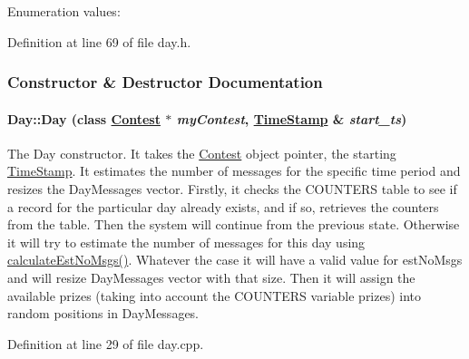 \begin{Desc}
\item[Enumeration values: ]\par
\begin{description}
\item[{\em 
\hypertarget{classDay_Dayu4Dayu1}{
{\em default\_\-est\-No\-Msgs}}
\label{classDay_Dayu4Dayu1}
}]\item[{\em 
\hypertarget{classDay_Dayu4Dayu2}{
{\em min\_\-est\-No\-Msgs}}
\label{classDay_Dayu4Dayu2}
}]\end{description}
\end{Desc}



Definition at line 69 of file day.h.

\subsubsection{Constructor \& Destructor Documentation}
\hypertarget{classDay_Daya0}{
\paragraph[Day]{\setlength{\rightskip}{0pt plus 5cm}Day::Day (class \hyperlink{classContest}{Contest} $\ast$ {\em my\-Contest}, \hyperlink{classTimeStamp}{Time\-Stamp} \& {\em start\_\-ts})}\hfill}
\label{classDay_Daya0}


The Day constructor. It takes the \hyperlink{classContest}{Contest} object pointer, the starting \hyperlink{classTimeStamp}{Time\-Stamp}. It estimates the number of messages for the specific time period and resizes the Day\-Messages vector. Firstly, it checks the COUNTERS table to see if a record for the particular day already exists, and if so, retrieves the counters from the table. Then the system will continue from the previous state. Otherwise it will try to estimate the number of messages for this day using \hyperlink{classDay_Daya6}{calculate\-Est\-No\-Msgs()}. Whatever the case it will have a valid value for est\-No\-Msgs and will resize Day\-Messages vector with that size. Then it will assign the available prizes (taking into account the COUNTERS variable prizes) into random positions in Day\-Messages. 

Definition at line 29 of file day.cpp.


